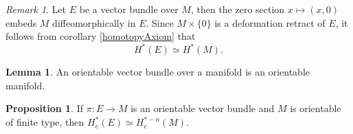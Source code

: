 \documentclass[twocolumn]{article}
\theoremstyle{definition}
\newtheorem{lemma}[definition]{Lemma}
\newtheorem{proposition}[definition]{Proposition}
\theoremstyle{remark}
\newtheorem*{remark}{Remark}
\begin{document}
\begin{remark}
    Let $E$ be a vector bundle over $M$, then the zero section $x \mapsto (x, 0)$ embeds $M$ diffeomorphically in $E$.
    Since $M \times \{0 \}$ is a deformation retract of $E$, it follows from corollary \ref{homotopyAxiom} that
    \begin{equation}
        H^*(E) \simeq H^*(M).
    \end{equation}
\end{remark}
\begin{lemma}
    An orientable vector bundle over a manifold is an orientable manifold.
\end{lemma}
\begin{proposition}
    If $\pi: E \rightarrow M$ is an orientable vector bundle and $M$ is orientable of finite type, then $H_c^*(E) \simeq H_c^{*-n}(M)$.
\end{proposition}
\end{document}
